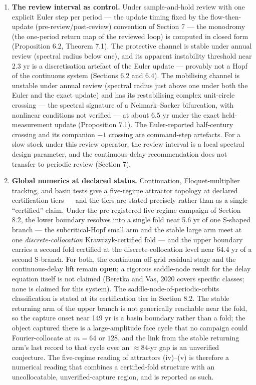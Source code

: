 \documentclass[11pt]{article}
\begin{document}
\begin{enumerate}
  5.4).
\item
  \textbf{The review interval as control.} Under sample-and-hold review
  with one explicit Euler step per period --- the update timing fixed by
  the flow-then-update (pre-review/post-review) convention of Section 7
  --- the monodromy (the one-period return map of the reviewed loop) is
  computed in closed form (Proposition 6.2, Theorem 7.1). The protective
  channel is stable under annual review (spectral radius below one), and
  its apparent instability threshold near 2.3 yr is a discretisation
  artefact of the Euler update --- provably not a Hopf of the continuous
  system (Sections 6.2 and 6.4). The mobilising channel is unstable
  under annual review (spectral radius just above one under both the
  Euler and the exact update) and has its restabilising complex
  unit-circle crossing --- the spectral signature of a Neimark--Sacker
  bifurcation, with nonlinear conditions not verified --- at about 6.5
  yr under the exact held-measurement update (Proposition 7.1). The
  Euler-reported half-century crossing and its companion \(-1\) crossing
  are command-step artefacts. For a slow stock under this review
  operator, the review interval is a local spectral design parameter,
  and the continuous-delay recommendation does not transfer to periodic
  review (Section 7).
\item
  \textbf{Global numerics at declared status.} Continuation,
  Floquet-multiplier tracking, and basin tests give a five-regime
  attractor topology at declared certification tiers --- and the tiers
  are stated precisely rather than as a single ``certified'' claim.
  Under the pre-registered five-regime campaign of Section 8.2, the
  lower boundary resolves into a single fold near 5.6 yr of one S-shaped
  branch --- the subcritical-Hopf small arm and the stable large arm
  meet at one \emph{discrete-collocation} Krawczyk-certified fold ---
  and the upper boundary carries a second fold certified at the
  discrete-collocation level near 64.4 yr of a second S-branch. For
  both, the continuum off-grid residual stage and the continuous-delay
  lift remain \textbf{open}; a rigorous saddle-node result for the delay
  equation itself is not claimed (Beretka and Vas, 2020 covers specific
  classes; none is claimed for this system). The
  saddle-node-of-periodic-orbits classification is stated at its
  certification tier in Section 8.2. The stable returning arm of the
  upper branch is not generically reachable near the fold, so the
  capture onset near 149 yr is a basin boundary rather than a fold; the
  object captured there is a large-amplitude face cycle that no campaign
  could Fourier-collocate at \(m = 64\) or \(128\), and the link from
  the stable returning arm's last record to that cycle over an
  \(\approx 84\)-yr gap is an unverified conjecture. The five-regime
  reading of attractors (iv)--(v) is therefore a numerical reading that
  combines a certified-fold structure with an uncollocatable,
  unverified-capture region, and is reported as such.
\end{enumerate}
\end{document}
